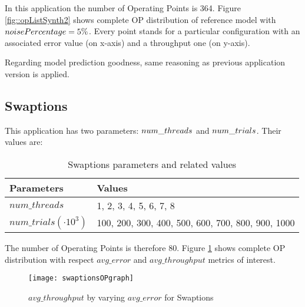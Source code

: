 In this application the number of Operating Points is 364. Figure \ref{fig::opListSynth2} shows complete OP distribution of reference model with $noise\-Per\-cent\-age = 5\%$. Every point stands for a particular configuration with an associated error value (on x-axis) and a throughput one (on y-axis).

Regarding model prediction goodness, same reasoning as previous application version is applied.


\subsection{Swaptions}

This application has two parameters: $num\_\-threads$ and $num\_\-trials$. Their values are:

\begin{table}[H]

    \centering

    \begin{tabular}{ll}
    
        \toprule
        Parameters & Values \\
        \midrule
        $num\_threads$ & 1, 2, 3, 4, 5, 6, 7, 8 \\
        $num\_trials (\cdot 10^3)$ & 100, 200, 300, 400, 500, 600, 700, 800, 900, 1000 \\
        \bottomrule 
    
    \end{tabular}

    \caption{Swaptions parameters and related values}

\end{table}

The number of Operating Points is therefore 80. Figure \ref{fig::swaptionsOPs} shows complete OP distribution with respect $avg\_error$ and $avg\_throughput$ metrics of interest.

\begin{figure}[ht]

    \centering

    \texttt{[image: swaptionsOPgraph]}

    \caption{$avg\_throughput$ by varying $avg\_error$ for Swaptions}

    \label{fig::swaptionsOPs}
    
\end{figure}






